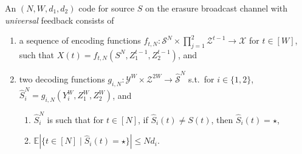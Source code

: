 \begin{mydef}
\label{def:code_two_users_feedback}
	An $(N, W, d_{1}, d_{2})$ code for source $S$ on the erasure broadcast channel with \emph{universal} feedback consists of	
	\begin{enumerate}
		\item a sequence of encoding functions $f_{t, N} : \mathcal{S}^{N} \times  \prod_{j = 1}^{2} \mathcal{Z}^{t-1} \to \mathcal{X}$ for $t \in [W]$, such that $X(t) = f_{t, N}(S^{N}, Z_1^{t -1}, Z_2^{t -1})$, and
		
		\item two decoding functions $g_{i,N} : \mathcal{Y}^{W} \times \mathcal{Z}^{2W} \to \mathcal{\hat{S}}^{N}$ s.t.\ for $i \in \{1, 2\}$, $\hat{S}_{i}^{N} = g_{i,N}(Y_{i}^{W}, Z_1^{W}, Z_2^{W})$, and
		\begin{enumerate}
			\item $\hat{S}_{i}^{N}$ is such that for $t \in [N]$, if $\hat{S}_{i}(t) \neq S(t)$, then $\hat{S}_{i}(t) = \star$,
			\item $\mathbb{E}   \left\vert{\{t \in [N] \mid \hat{S}_{i}(t) = \star\}}\right\vert \leq N d_{i}$.
		\end{enumerate}
		 	
	\end{enumerate}
	
\end{mydef}

